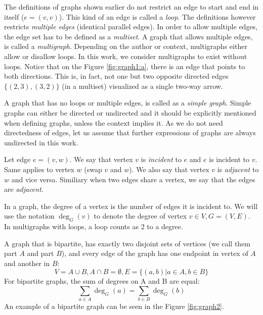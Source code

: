 The definitions of graphs shown earlier do not restrict an edge to start and end in itself ($e=(v, v)$).
This kind of an edge is called a \emph{loop}.
The definitions however restricts \emph{multiple edges} (identical parallel edges).
In order to allow multiple edges, the edge set has to be defined as a \emph{multiset}.
A graph that allows multiple edges, is called a \emph{multigraph}.
Depending on the author or context, multigraphs either allow or disallow loops.
In this work, we consider multigraphs to exist without loops.
Notice that on the Figure \ref{fig:graph1:a}, there is an edge that points to both directions.
This is, in fact, not one but two opposite directed edges $\{(2,3), (3,2)\}$ (in a multiset) visualized as a single two-way arrow.

A graph that has no loops or multiple edges, is called as a \emph{simple graph}.
Simple graphs can either be directed or undirected and it should be explicitly mentioned when defining graphs, unless the context implies it.
As we do not need directedness of edges, let us assume that further expressions of graphs are always undirected in this work.

Let edge $e=(v,w)$.
We say that vertex $v$ is \emph{incident} to $e$ and $e$ is incident to $v$.
Same applies to vertex $w$ (swap $v$ and $w$).
We also say that vertex $v$ is \emph{adjacent} to $w$ and vice versa.
Similiary when two edges share a vertex, we say that the edges are \emph{adjacent}.

In a graph, the degree of a vertex is the number of edges it is incident to.
We will use the notation $\deg_G(v)$ to denote the degree of vertex $v \in V, G=(V,E)$.
In multigraphs with loops, a loop counts as 2 to a degree.

A graph that is bipartite, has exactly two disjoint sets of vertices (we call them part $A$ and part $B$), and every edge of the graph has one endpoint in vertex of $A$ and another in $B$:
\begin{equation}
V = A \cup B, A \cap B = \emptyset, E=\{(a, b) | a \in A, b \in B\}
\end{equation}
For bipartite graphs, the sum of degrees on A and B are equal:
\begin{equation}
\sum_{a\in A} \deg_G(a) = \sum_{b\in B} \deg_G(b)
\end{equation}
An example of a bipartite graph can be seen in the Figure \ref{fig:graph2}.

